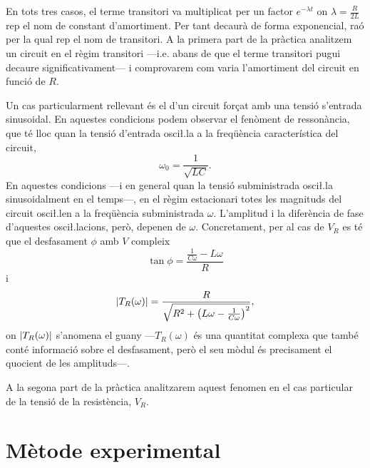 En tots tres casos, el terme transitori va multiplicat per un factor \( e^{-\lambda t} \) on \( \lambda = \frac{R}{2L} \) rep el nom de constant d'amortiment. Per tant decaurà de forma exponencial, raó per la qual rep el nom de transitori. A la primera part de la pràctica analitzem un circuit en el règim transitori ---i.e. abans de que el terme transitori pugui decaure significativament--- i comprovarem com varia l'amortiment del circuit en funció de \( R \).  

Un cas particularment rellevant és el d'un circuit forçat amb una tensió s'entrada sinusoidal. En aquestes condicions podem observar el fenòment de ressonància, que té lloc quan la tensió d'entrada osci\l.la a la freqüència característica del circuit, 
\begin{equation}\label{eq:freq ressonancia}
	\omega_0 = \frac{1}{\sqrt{LC}}.
\end{equation}
En aquestes condicions ---i en general quan la tensió subministrada osci\l.la sinusoidalment en el temps---, en el règim estacionari totes les magnituds del circuit osci\l.len a la freqüència subministrada \( \omega \). L'amplitud i la diferència de fase d'aquestes osci\l.lacions, però, depenen de \( \omega \). Concretament, per al cas de \( V_R \) es té que el desfasament \( \phi \) amb \( V \) compleix
\begin{equation} \label{eq:desfasament}
	\tan{\phi} = \frac{\frac{1}{C\omega} - L\omega}{R}
\end{equation}
i 
\begin{equation} \label{eq:guany}
	\left\lvert T_R(\omega) \right\rvert = \frac{R}{\sqrt{R^2 + \left(L\omega - \frac{1}{C\omega}\right)^2}},
\end{equation}
on \( \left\lvert T_R(\omega) \right\rvert \) s'anomena el guany ---\( T_R(\omega) \) és una quantitat complexa que també conté informació sobre el desfasament, però el seu mòdul és precisament el quocient de les amplituds---.

A la segona part de la pràctica analitzarem aquest fenomen en el cas particular de la tensió de la resistència, \( V_R \).   

\section{Mètode experimental}

